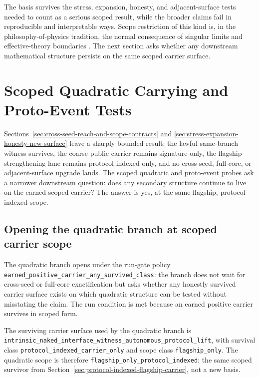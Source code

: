 \documentclass[11pt]{article}
\theoremstyle{definition}
\begin{document}
The basis survives the stress, expansion, honesty, and adjacent-surface tests needed
to count as a serious scoped result, while the broader claims fail in reproducible and
interpretable ways. Scope restriction of this kind is, in the philosophy-of-physics
tradition, the normal consequence of singular limits and effective-theory boundaries
\citep{Batterman2002}. The next section asks whether any downstream mathematical
structure persists on the same scoped carrier surface.
 \section{Scoped Quadratic Carrying and Proto-Event Tests}
\label{sec:scoped-quadratic-carrying-and-proto-event-tests}
\label{sec:quadratic-carrying-and-proto-event-pilot}

Sections~\ref{sec:cross-seed-reach-and-scope-contracts} and
\ref{sec:stress-expansion-honesty-new-surface} leave a sharply bounded result: the
lawful same-branch witness survives, the coarse public carrier remains signature-only,
the flagship strengthening lane remains protocol-indexed-only, and no cross-seed,
full-core, or adjacent-surface upgrade lands. The scoped quadratic and proto-event
probes ask a narrower downstream question: does any secondary structure continue to
live on the earned scoped carrier? The answer is yes, at the same flagship,
protocol-indexed scope.

\subsection{Opening the quadratic branch at scoped carrier scope}

The quadratic branch opens under the run-gate policy
\nolinkurl{earned_positive_carrier_any_survived_class}: the branch does not wait for
cross-seed or full-core exactification but asks whether any honestly survived carrier
surface exists on which quadratic structure can be tested without misstating the
claim. The run condition is met because an earned positive carrier survives in scoped
form.

The surviving carrier surface used by the quadratic branch is
\nolinkurl{intrinsic_naked_interface_witness_autonomous_protocol_lift}, with survival
class \texttt{protocol\_indexed\_carrier\_only} and scope class \texttt{flagship\_only}.
The quadratic scope is therefore \texttt{flagship\_only\_protocol\_indexed}: the same
scoped survivor from Section~\ref{sec:protocol-indexed-flagship-carrier}, not a new
basis.
\end{document}
